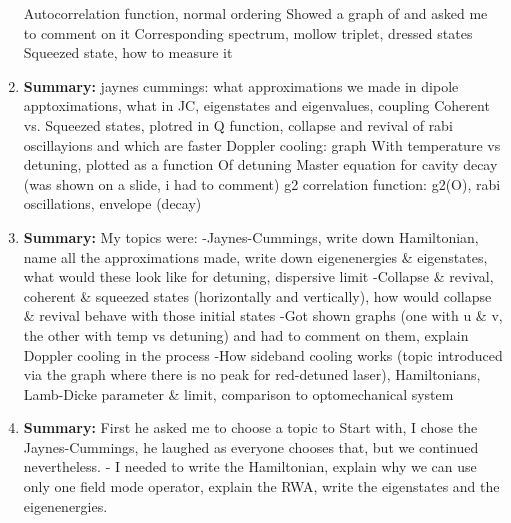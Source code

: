 \documentclass{article}%
\begin{document}
\begin{enumerate}
Autocorrelation function, normal ordering\newline%
Showed a graph of and asked me to comment on it\newline%
Corresponding spectrum, mollow triplet, dressed states\newline%
Squeezed state, how to measure it%
\item%
\begin{mycolorbox}%
\textbf{Summary:}%
\newline%
jaynes cummings: what approximations we made in dipole apptoximations, what in JC, eigenstates and eigenvalues, coupling\newline%
Coherent vs. Squeezed states, plotred in Q function, collapse and revival of rabi oscillayions and which are faster\newline%
Doppler cooling: graph With temperature vs detuning, plotted as a function Of detuning\newline%
Master equation for cavity decay (was shown on a slide, i had to comment)\newline%
g2 correlation function: g2(O), rabi oscillations, envelope (decay)%
\end{mycolorbox}%
\item%
\textbf{Summary:}%
\newline%
My topics were:\newline%
 {-}Jaynes{-}Cummings, write down Hamiltonian, name all the approximations made, write down eigenenergies \& eigenstates, what would these look like for detuning, dispersive limit\newline%
 {-}Collapse \& revival, coherent \& squeezed states (horizontally and vertically), how would collapse \& revival behave with those initial states\newline%
 {-}Got shown graphs (one with u \& v, the other with temp vs detuning) and had to comment on them, explain Doppler cooling in the process\newline%
 {-}How sideband cooling works (topic introduced via the graph where there is no peak for red{-}detuned laser), Hamiltonians, Lamb{-}Dicke parameter \& limit, comparison to optomechanical system%
\item%
\begin{mycolorbox}%
\textbf{Summary:}%
\newline%
First he asked me to choose a topic to Start with, I chose the Jaynes{-}Cummings, he laughed as everyone chooses that, but we continued nevertheless.\newline%
{-} I needed to write the Hamiltonian, explain why we can use only one field mode operator, explain the RWA, write the eigenstates and the eigenenergies.\newline%

\end{mycolorbox}
\end{enumerate}
\end{document}
